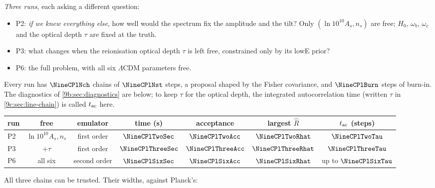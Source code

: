 \emph{Three runs}, each asking a different question:
\begin{itemize}[itemsep=1pt]
  \item P2: \emph{if we knew everything else}, how well would the spectrum fix the amplitude and the tilt? Only
        $(\ln10^{10}A_s,n_s)$ are free; $H_0$, $\omega_b$, $\omega_c$ and the optical depth $\tau$ are fixed at the truth.
  \item P3: what changes when the reionisation optical depth $\tau$ is left free, constrained only by its lowE prior?
  \item P6: the full problem, with all six $\Lambda$CDM parameters free.
\end{itemize}
Every run has $\NineCPlNch$ chains of $\NineCPlNst$ steps, a proposal shaped by the Fisher covariance, and $\NineCPlBurn$
steps of burn-in. The diagnostics of \cref{9b:sec:diagnostics} are below; to keep $\tau$ for the optical depth, the
integrated autocorrelation time (written $\tau$ in \cref{9c:sec:line-chain}) is called $t_{\rm ac}$ here.
\begin{center}
\small
\renewcommand{\arraystretch}{1.15}
\begin{tabular}{@{}lcccccc@{}}
\toprule
run & free & emulator & time (s) & acceptance & largest $\hat R$ & $t_{\rm ac}$ (steps)\\\midrule
P2 & $\ln10^{10}A_s,n_s$ & first order & $\NineCPlTwoSec$ & $\NineCPlTwoAcc$ & $\NineCPlTwoRhat$ & $\NineCPlTwoTau$\\
P3 & $+\tau$ & first order & $\NineCPlThreeSec$ & $\NineCPlThreeAcc$ & $\NineCPlThreeRhat$ & $\NineCPlThreeTau$\\
P6 & all six & second order & $\NineCPlSixSec$ & $\NineCPlSixAcc$ & $\NineCPlSixRhat$ & up to $\NineCPlSixTau$\\
\bottomrule
\end{tabular}
\end{center}
All three chains can be trusted. Their widths, against Planck's:
